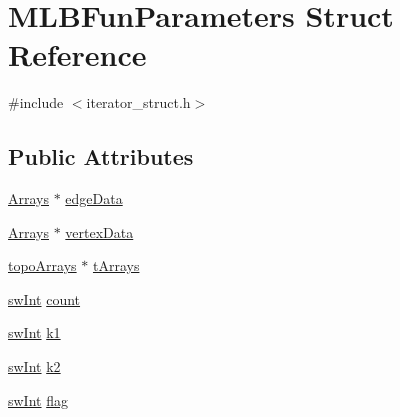 \hypertarget{structMLBFunParameters}{
\section{MLBFunParameters Struct Reference}
\label{structMLBFunParameters}
}


{\ttfamily \#include $<$iterator\_\-struct.h$>$}\subsection*{Public Attributes}
\begin{DoxyCompactItemize}
\item 
\hyperlink{structArrays}{Arrays} $\ast$ \hyperlink{structMLBFunParameters_a877290c3746a4a1443e312d225dc6963}{edgeData}
\item 
\hyperlink{structArrays}{Arrays} $\ast$ \hyperlink{structMLBFunParameters_ac10ea14c3141f3e566dee0568f1f4b2f}{vertexData}
\item 
\hyperlink{structtopoArrays}{topoArrays} $\ast$ \hyperlink{structMLBFunParameters_ae7e20a4db032dafb9a56836cfb3a4ea8}{tArrays}
\item 
\hyperlink{swMacro_8h_a113cf5f6b5377cdf3fac6aa4e443e9aa}{swInt} \hyperlink{structMLBFunParameters_a3bde90af55aad6097d41a322c89f3578}{count}
\item 
\hyperlink{swMacro_8h_a113cf5f6b5377cdf3fac6aa4e443e9aa}{swInt} \hyperlink{structMLBFunParameters_acc4e1b0ab4700da0f0a68a617209aebb}{k1}
\item 
\hyperlink{swMacro_8h_a113cf5f6b5377cdf3fac6aa4e443e9aa}{swInt} \hyperlink{structMLBFunParameters_ae30f1ae18cf7dc38b28d8dcacfe57eff}{k2}
\item 
\hyperlink{swMacro_8h_a113cf5f6b5377cdf3fac6aa4e443e9aa}{swInt} \hyperlink{structMLBFunParameters_a7e2c8948155a41ba59c48aa27e78c50a}{flag}
\end{DoxyCompactItemize}


